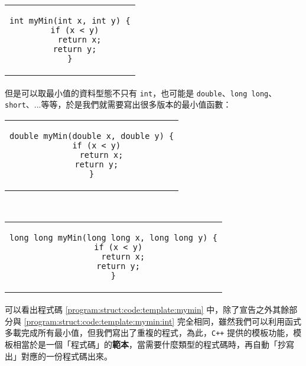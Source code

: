 \documentclass[12pt,a4paper,oneside]{report}
\begin{document}
\begin{CJK}{UTF8}{bkai}
\begin{code}[h!]
\centering
\begin{tabular}{c}
\begin{lstlisting}
int myMin(int x, int y) {
  if (x < y)
    return x;
  return y;
}
\end{lstlisting}
\end{tabular}
\caption{\lstinline!myMin! 函數}
\label{program:struct:code:template:mymin:int}
\end{code}

\paragraph{}但是可以取最小值的資料型態不只有 \lstinline!int!，也可能是 \lstinline!double!、\lstinline!long long!、\lstinline!short!、...等等，於是我們就需要寫出很多版本的最小值函數：

\begin{code}[h!]
\centering
\begin{subcode}{\textwidth}
  \centering
  \begin{tabular}{c}
  \begin{lstlisting}
double myMin(double x, double y) {
  if (x < y)
    return x;
  return y;
}
  \end{lstlisting}
  \end{tabular}
  \caption{\lstinline!double! 版本}
  \label{program:struct:code:template:mymin:double}
\end{subcode}
~
\begin{subcode}{\textwidth}
  \centering
  \begin{tabular}{c}
  \begin{lstlisting}
long long myMin(long long x, long long y) {
  if (x < y)
    return x;
  return y;
}
  \end{lstlisting}
  \end{tabular}
  \caption{\lstinline!long long! 版本}
  \label{program:struct:code:template:mymin:long:long}
\end{subcode}
\caption{其他 \lstinline!myMin! 函數}
\label{program:struct:code:template:mymin}
\end{code}

\paragraph{}可以看出程式碼 \ref{program:struct:code:template:mymin} 中，除了宣告之外其餘部分與 \ref{program:struct:code:template:mymin:int} 完全相同，雖然我們可以利用函式多載完成所有最小值，但我們寫出了重複的程式，為此，\texttt{C++} 提供的模板功能，模板相當於是一個「程式碼」的{\color{red}\textbf{範本}}，當需要什麼類型的程式碼時，再自動「抄寫出」對應的一份程式碼出來。


\end{CJK}
\end{document}
